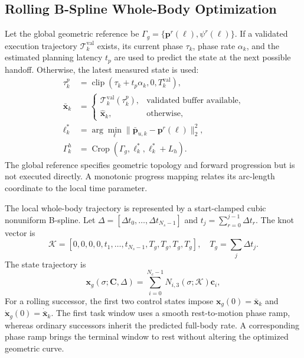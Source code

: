 \documentclass[journal,twoside]{IEEEtran}
\begin{document}
\subsection{Rolling B-Spline Whole-Body Optimization}
Let the global geometric reference be $\Gamma_g=\{\mathbf p^r(\ell),\psi^r(\ell)\}$. If a validated execution trajectory $\mathcal T_k^{\mathrm{val}}$ exists, its current phase $\tau_k$, phase rate $\alpha_k$, and the estimated planning latency $t_p$ are used to predict the state at the next possible handoff. Otherwise, the latest measured state is used:
\begin{equation}
\begin{aligned}
\tau_k^p&=\operatorname{clip}(\tau_k+t_p\alpha_k,0,T_k^{\mathrm{val}}),\\
\bar{\mathbf x}_k&=
\begin{cases}
\mathcal T_k^{\mathrm{val}}(\tau_k^p),&\text{validated buffer available},\\
\hat{\mathbf x}_k,&\text{otherwise},
\end{cases}\\
\ell_k^*&=\arg\min_\ell\|\bar{\mathbf p}_{u,k}-\mathbf p^r(\ell)\|_2^2,\\
\Gamma_k^h&=\operatorname{Crop}(\Gamma_g,\ell_k^*,\ell_k^*+L_h).
\end{aligned}
\label{eq:rolling_crop}
\end{equation}
The global reference specifies geometric topology and forward progression but is not executed directly. A monotonic progress mapping relates its arc-length coordinate to the local time parameter.

The local whole-body trajectory is represented by a start-clamped cubic nonuniform B-spline. Let $\Delta=[\Delta t_0,\ldots,\Delta t_{N_s-1}]$ and $t_j=\sum_{r=0}^{j-1}\Delta t_r$. The knot vector is
\begin{equation}
\mathcal K=[0,0,0,0,t_1,\ldots,t_{N_s-1},T_g,T_g,T_g,T_g],
\quad T_g=\sum_j\Delta t_j.
\label{eq:knot_vector}
\end{equation}
The state trajectory is
\begin{equation}
\mathbf x_g(\sigma;\mathbf C,\Delta)=
\sum_{i=0}^{N_c-1}N_{i,3}(\sigma;\mathcal K)\mathbf c_i,
\label{eq:bspline_traj}
\end{equation}
For a rolling successor, the first two control states impose $\mathbf x_g(0)=\bar{\mathbf x}_k$ and $\dot{\mathbf x}_g(0)=\dot{\bar{\mathbf x}}_k$. The first task window uses a smooth rest-to-motion phase ramp, whereas ordinary successors inherit the predicted full-body rate. A corresponding phase ramp brings the terminal window to rest without altering the optimized geometric curve.
\end{document}
